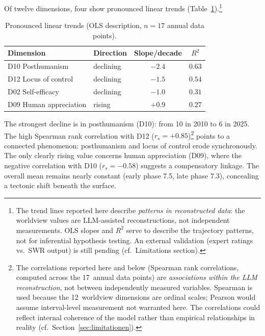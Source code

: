 \documentclass[12pt,a4paper]{article}
\begin{document}
Of twelve dimensions, four show pronounced linear trends (Table~\ref{tab:trends}).\footnote{The trend lines reported here describe \textit{patterns in reconstructed data}: the worldview values are LLM-assisted reconstructions, not independent measurements. OLS slopes and $R^2$ serve to describe the trajectory patterns, not for inferential hypothesis testing. An external validation (expert ratings vs.\ SWR output) is still pending (cf.\ Limitations section).}

\begin{table}[htbp]
  \centering
  \caption{Pronounced linear trends (OLS description, $n=17$ annual data points).}
  \label{tab:trends}
  \begin{tabular}{l l c c}
    \toprule
    \textbf{Dimension} & \textbf{Direction} & \textbf{Slope/decade} & $R^2$ \\
    \midrule
    D10 Posthumanism          & declining & $-2.4$ & $0.63$ \\
    \addlinespace[2pt]
    D12 Locus of control      & declining & $-1.5$ & $0.54$ \\
    \addlinespace[2pt]
    D02 Self-efficacy          & declining & $-1.0$ & $0.31$ \\
    \addlinespace[2pt]
    D09 Human appreciation     & rising    & $+0.9$ & $0.27$ \\
    \bottomrule
  \end{tabular}
\end{table}

The strongest decline is in posthumanism (D10): from 10 in 2010 to 6 in 2025. The high Spearman rank correlation with D12 ($r_s = +0.85$)\footnote{The correlations reported here and below (Spearman rank correlations, computed across the 17~annual data points) are \emph{associations within the LLM reconstruction}, not between independently measured variables. Spearman is used because the 12~worldview dimensions are ordinal scales; Pearson would assume interval-level measurement not warranted here. The correlations could reflect internal coherence of the model rather than empirical relationships in reality (cf.\ Section~\ref{sec:limitationen}).} points to a connected phenomenon: posthumanism and locus of control erode synchronously. The only clearly rising value concerns human appreciation (D09), where the negative correlation with D10 ($r_s = -0.58$) suggests a compensatory linkage. The overall mean remains nearly constant (early phase 7.5, late phase 7.3), concealing a tectonic shift beneath the surface.
\end{document}
